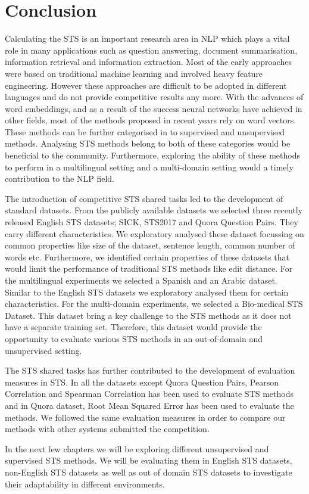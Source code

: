 \section{Conclusion}
Calculating the STS is an important research area in NLP which plays a vital role in many applications such as question answering, document summarisation, information retrieval and information extraction. Most of the early approaches were based on traditional machine learning and involved heavy feature engineering. However these approaches are difficult to be adopted in different languages and do not provide competitive results any more. With the advances of word embeddings, and as a result of the success neural networks have achieved in other fields, most of the methods proposed in recent years rely on word vectors. These methods can be further categorised in to supervised and unsupervised methods. Analysing STS methods belong to both of these categories would be beneficial to the community. Furthermore, exploring the ability of these methods to perform in a multilingual setting and a multi-domain setting would a timely contribution to the NLP field. 

The introduction of competitive STS shared tasks led to the development of standard datasets. From the publicly available datasets we selected three recently released English STS datasets; SICK, STS2017 and Quora Question Pairs. They carry different characteristics. We exploratory analysed these dataset focussing on common properties like size of the dataset, sentence length, common number of words etc. Furthermore, we identified certain properties of these datasets that would limit the performance of traditional STS methods like edit distance. For the multilingual experiments we selected a Spanish and an Arabic dataset. Similar to the English STS datasets we exploratory analysed them for certain characteristics. For the multi-domain experiments, we selected a Bio-medical STS Dataset. This dataset bring a key challenge to the STS methods as it does not have a separate training set. Therefore, this dataset would provide the opportunity to evaluate various STS methods in an out-of-domain and unsupervised setting.

The STS shared tasks has further contributed to the development of evaluation measures in STS. In all the datasets except Quora Question Pairs, Pearson Correlation and Spearman Correlation has been used to evaluate STS methods and in Quora dataset, Root Mean Squared Error has been used to evaluate the methods. We followed the same evaluation measures in order to compare our methods with other systems submitted the competition. 

In the next few chapters we will be exploring different unsupervised and supervised STS methods. We will be evaluating them in English STS datasets, non-English STS datasets as well as out of domain STS datasets to investigate their adaptability in different environments.

   


